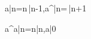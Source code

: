 a|n\rangle=\sqrt n\,|n-1\rangle,\qquad a^\dagger|n\rangle=\,|n+1\rangle

a^\dagger a|n\rangle=n|n\rangle,\qquad a|0
